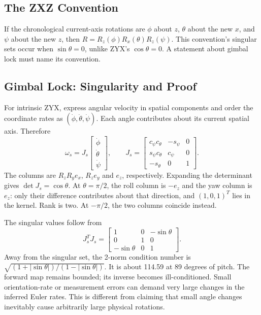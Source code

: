 \subsection{The ZXZ Convention}

If the chronological current-axis rotations are $\phi$ about $z$, $\theta$ about the new $x$, and $\psi$ about the new $z$, then $R=R_z(\phi)R_x(\theta)R_z(\psi)$. This convention's singular sets occur when $\sin\theta=0$, unlike ZYX's $\cos\theta=0$. A statement about gimbal lock must name its convention.

\subsection{Gimbal Lock: Singularity and Proof}
\label{sec:gimbal_lock}
\label{laymans:gimballock}
\label{thm:gimbal_lock_proof}

For intrinsic ZYX, express angular velocity in spatial components and order the coordinate rates as $(\dot\phi,\dot\theta,\dot\psi)$. Each angle contributes about its current spatial axis. Therefore
\begin{equation}
 \omega_s=J_s\begin{bmatrix}\dot\phi\\\dot\theta\\\dot\psi\end{bmatrix},\qquad
 J_s=\begin{bmatrix}
 c_\psi c_\theta&-s_\psi&0\\
 s_\psi c_\theta&c_\psi&0\\
 -s_\theta&0&1
 \end{bmatrix}.
 \label{eq:euler_spatial_rate_map}
\end{equation}
The columns are $R_zR_ye_x$, $R_ze_y$ and $e_z$, respectively. Expanding the determinant gives $\det J_s=\cos\theta$. At $\theta=\pi/2$, the roll column is $-e_z$ and the yaw column is $e_z$: only their difference contributes about that direction, and $(1,0,1)^T$ lies in the kernel. Rank is two. At $-\pi/2$, the two columns coincide instead.

The singular values follow from
\begin{equation}
 J_s^TJ_s=\begin{bmatrix}1&0&-\sin\theta\\0&1&0\\-\sin\theta&0&1\end{bmatrix}.
 \label{eq:euler_rate_conditioning}
\end{equation}
Away from the singular set, the 2-norm condition number is $\sqrt{(1+|\sin\theta|)/(1-|\sin\theta|)}$. It is about 114.59 at 89 degrees of pitch. The forward map remains bounded; its inverse becomes ill-conditioned. Small orientation-rate or measurement errors can demand very large changes in the inferred Euler rates. This is different from claiming that small angle changes inevitably cause arbitrarily large physical rotations.

